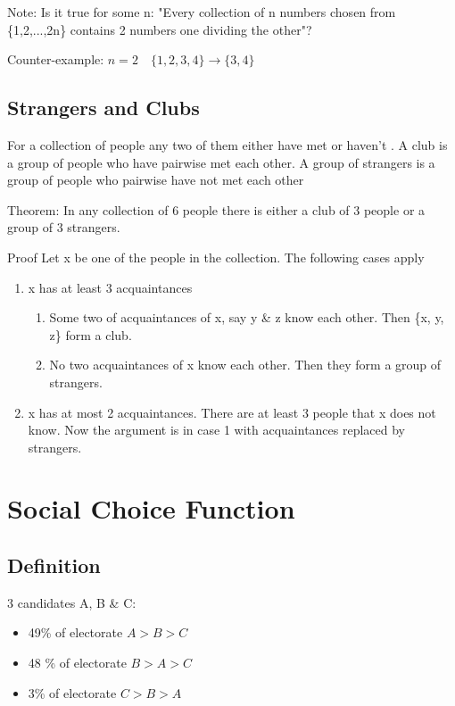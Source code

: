 \documentclass[9pt, letterpaper, oneside]{article}
\begin{document}
Note: Is it true for some n:
"Every collection of n numbers chosen from \{1,2,...,2n\} contains 2 numbers one dividing the other"?

Counter-example: $n = 2 \quad \{1,2,3,4\} \to \{3,4\}$



\subsection{Strangers and Clubs}

For a collection of people any two of them either have met or haven't . A club is a group of people who have pairwise met each other. A group of strangers is a group of people who pairwise have not met each other

Theorem: In any collection of 6 people there is either a club of 3 people or a group of 3 strangers.

Proof Let x be one of the people in the collection. The following cases apply
\begin{enumerate}
	\item x has at least 3 acquaintances
	\begin{enumerate}
		\item Some two of acquaintances of x, say y \& z know each other. Then \{x, y, z\} form a club.
		\item No two acquaintances of x know each other. Then they form a group of strangers.
	\end{enumerate}
	\item x has at most 2 acquaintances. There are at least 3 people that x does not know. Now the argument is in case 1 with acquaintances replaced by strangers.
\end{enumerate}

\section{Social Choice Function}

\subsection{Definition}
3 candidates A, B \& C:
\begin{itemize}
	\item 49\% of electorate $A > B > C$
	\item 48 \% of electorate $B > A > C$
	\item 3\% of electorate $C > B > A$
\end{itemize}
\end{document}
